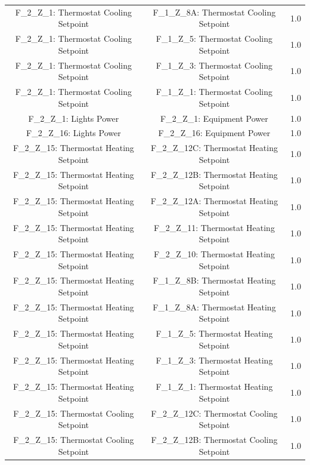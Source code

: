 \documentclass[aps, 10pt, a4paper]{article}
\begin{document}
\begin{longtable}{c|c||c}
                    F\_2\_Z\_1: Thermostat Cooling Setpoint & F\_1\_Z\_8A: Thermostat Cooling Setpoint & 1.0 \\
                    F\_2\_Z\_1: Thermostat Cooling Setpoint & F\_1\_Z\_5: Thermostat Cooling Setpoint & 1.0 \\
                    F\_2\_Z\_1: Thermostat Cooling Setpoint & F\_1\_Z\_3: Thermostat Cooling Setpoint & 1.0 \\
                    F\_2\_Z\_1: Thermostat Cooling Setpoint & F\_1\_Z\_1: Thermostat Cooling Setpoint & 1.0 \\
                    F\_2\_Z\_1: Lights Power & F\_2\_Z\_1: Equipment Power & 1.0 \\
                    F\_2\_Z\_16: Lights Power & F\_2\_Z\_16: Equipment Power & 1.0 \\
                    F\_2\_Z\_15: Thermostat Heating Setpoint & F\_2\_Z\_12C: Thermostat Heating Setpoint & 1.0 \\
                    F\_2\_Z\_15: Thermostat Heating Setpoint & F\_2\_Z\_12B: Thermostat Heating Setpoint & 1.0 \\
                    F\_2\_Z\_15: Thermostat Heating Setpoint & F\_2\_Z\_12A: Thermostat Heating Setpoint & 1.0 \\
                    F\_2\_Z\_15: Thermostat Heating Setpoint & F\_2\_Z\_11: Thermostat Heating Setpoint & 1.0 \\
                    F\_2\_Z\_15: Thermostat Heating Setpoint & F\_2\_Z\_10: Thermostat Heating Setpoint & 1.0 \\
                    F\_2\_Z\_15: Thermostat Heating Setpoint & F\_1\_Z\_8B: Thermostat Heating Setpoint & 1.0 \\
                    F\_2\_Z\_15: Thermostat Heating Setpoint & F\_1\_Z\_8A: Thermostat Heating Setpoint & 1.0 \\
                    F\_2\_Z\_15: Thermostat Heating Setpoint & F\_1\_Z\_5: Thermostat Heating Setpoint & 1.0 \\
                    F\_2\_Z\_15: Thermostat Heating Setpoint & F\_1\_Z\_3: Thermostat Heating Setpoint & 1.0 \\
                    F\_2\_Z\_15: Thermostat Heating Setpoint & F\_1\_Z\_1: Thermostat Heating Setpoint & 1.0 \\
                    F\_2\_Z\_15: Thermostat Cooling Setpoint & F\_2\_Z\_12C: Thermostat Cooling Setpoint & 1.0 \\
                    F\_2\_Z\_15: Thermostat Cooling Setpoint & F\_2\_Z\_12B: Thermostat Cooling Setpoint & 1.0 \\

\end{longtable}
\end{document}
